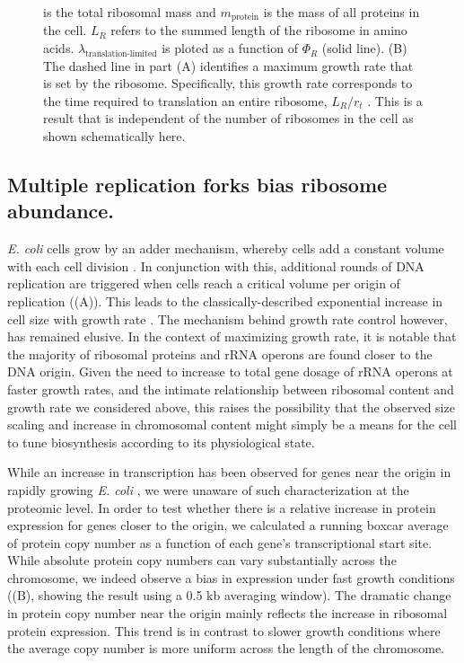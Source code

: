 \begin{figure}
\begin{fullwidth}
{{            is the total ribosomal mass and $m_{\textrm{protein}}$ is the mass
            of all proteins in the cell. $L_R$ refers to the summed length of
            the ribosome in amino acids.
            $\lambda_{\textrm{translation-limited}}$ is ploted as a function of
            $\Phi_R$ (solid line). (B) The dashed line in part (A) identifies a
            maximum growth rate that is set by the ribosome. Specifically, this
            growth rate corresponds to the time required to  translation an
            entire ribosome, $L_R/ r_t$ . This is a result that is independent
            of the number of ribosomes in the cell as shown schematically here.
            }
        \label{fig:translation_1}
        }
  \end{fullwidth}
\end{figure}


\subsection{Multiple replication forks bias ribosome abundance.}

\textit{E. coli} cells grow by an adder mechanism, whereby cells add a constant
volume with each cell division \citep{taheriaraghi2015}. In conjunction with
this, additional rounds of DNA replication are triggered when cells reach a
critical volume per origin of replication ((A)). This
leads to the classically-described exponential increase in cell size with growth
rate \cite{schaechter1958, si2017, si2019}. The mechanism behind growth rate
control however, has remained elusive. In the context of maximizing growth
rate, it is notable that the majority of ribosomal proteins and rRNA operons are
found closer to the DNA origin. Given the need to increase to total gene dosage
of rRNA operons at faster growth rates, and the intimate relationship between
ribosomal content and growth rate we considered above, this raises the
possibility that the observed size scaling and increase in chromosomal content
might simply be a means for the cell to tune biosynthesis according to its
physiological state.

While an increase in transcription has been observed for genes near the origin
in rapidly growing \textit{E. coli}  \citep{scholz2019}, we were unaware of such
characterization at the proteomic level. In order to test whether there is a
relative increase in protein expression for genes closer to the origin, we
calculated a running boxcar average of protein copy number as a function of
each gene's transcriptional start site. While absolute protein copy numbers can vary
substantially across the chromosome, we indeed observe a bias in expression
under fast growth conditions ((B), showing the result
using a 0.5 kb averaging window). The dramatic change in protein copy number
near the origin mainly reflects the increase in ribosomal protein expression.
This trend is in contrast to slower growth conditions where the average copy
number is more uniform across the length of the chromosome.


